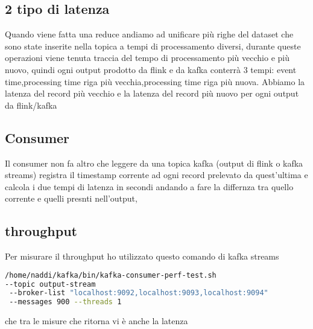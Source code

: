 \documentclass[acmsmall]{acmart}
\begin{document}
\subsection{2 tipo di latenza}
Quando viene fatta una reduce andiamo ad unificare più righe del dataset che sono state inserite nella topica a tempi di processamento diversi, durante queste operazioni viene tenuta traccia del tempo di processamento più vecchio e più nuovo, quindi ogni output prodotto da flink e da kafka conterrà 3 tempi:
event time,processing time riga più vecchia,processing time riga più nuova.
Abbiamo la latenza del record più vecchio e la latenza del record più nuovo
per ogni output da flink/kafka

\subsection{Consumer}
Il consumer non fa altro che leggere da una topica kafka (output di flink o kafka streams) registra il timestamp corrente ad ogni record prelevato da quest'ultima e calcola i due tempi di latenza in secondi andando a fare la differnza tra quello corrente e quelli presnti nell'output,

\subsection{throughput}
Per misurare il throughput ho utilizzato questo comando di kafka streams
\begin{lstlisting}[language=bash]
/home/naddi/kafka/bin/kafka-consumer-perf-test.sh 
--topic output-stream
 --broker-list "localhost:9092,localhost:9093,localhost:9094" 
 --messages 900 --threads 1
\end{lstlisting}
che tra le misure che ritorna vi è anche la latenza
\end{document}
